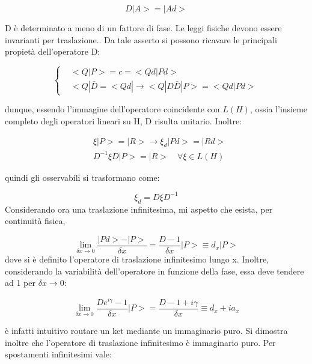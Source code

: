\documentclass{article}
\begin{document}
\begin{equation}
    D|A>=|Ad>
\end{equation}

D è determinato a meno di un fattore di fase.
Le leggi fisiche devono essere invarianti per traslazione..
Da tale asserto si possono ricavare le principali propietà dell'operatore D:

\begin{equation}
    \left\{
    \begin{aligned}
    & <Q |P>=c=<Qd|Pd> \\
    & <Q |\bar{D}= <Qd| \rightarrow <Q |D \bar{D}|P>=<Qd|Pd>
    \end{aligned}
    \right.
\end{equation}

dunque, essendo l'immagine dell'operatore coincidente con $L(H)$, ossia l'insieme completo degli operatori
lineari su H, D risulta unitario.
Inoltre:

\begin{equation}
    \begin{aligned}
        & \xi |P>=|R> \rightarrow \xi_d |Pd>= |Rd> \\
        & D^{-1}\xi D |P>= |R> \quad \forall  \xi \in L(H)
    \end{aligned}
\end{equation}

quindi gli osservabili si trasformano come:

\begin{equation}
    \xi_d = D \xi D^{-1}
\end{equation}
Considerando ora una traslazione infinitesima, mi aspetto che esista, per continuità fisica,

\begin{equation}
    \lim_{\delta x \rightarrow 0} \frac{|Pd>-|P>}{\delta x}= \frac{D-1}{\delta x}|P>\equiv d_x |P>
\end{equation}
dove si è definito l'operatore di traslazione infinitesimo lungo x.
Inoltre, considerando la variabilità dell'operatore in funzione della fase, essa deve tendere ad 1 per $\delta x \rightarrow 0$:

\begin{equation}
        \lim_{\delta x \rightarrow 0} \frac{De^{i\gamma}-1}{\delta x}|P>= \frac{D-1+i\gamma}{\delta x}\equiv d_x+ia_x
\end{equation}

è infatti intuitivo routare un ket mediante un immaginario puro.
Si dimostra inoltre che l'operatore di traslazione infinitesimo è immaginario puro.
Per spostamenti infinitesimi vale:
\end{document}
